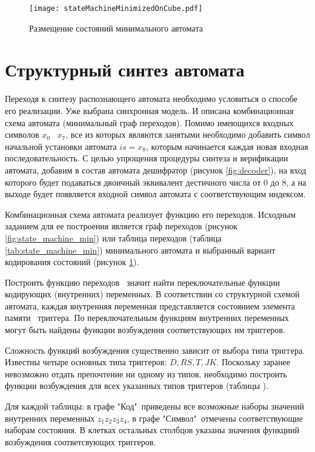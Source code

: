 \documentclass[a4paper,14pt,russian]{extarticle} %
\begin{document}
\begin{figure}[H]	
	\centering
	\texttt{[image: stateMachineMinimizedOnCube.pdf]}
	\caption{Размещение состояний минимального автомата}
	\label{fig:state_machine_on_cube}
\end{figure}

\section {Структурный синтез автомата}
Переходя к синтезу распознающего автомата необходимо условиться о способе его реализации. Уже выбрана синхронная модель. И описана комбинационная схема автомата (минимальный граф переходов). Помимо имеющихся входных символов \(x_0\) \textendash\ \(x_7\), все из которых являются занятыми необходимо добавить символ начальной установки автомата \(is=x_8\), которым начинается каждая новая входная последовательность. С целью упрощения процедуры синтеза и верификации автомата, добавим в состав автомата дешифратор (рисунок \ref{fig:decoder}), на вход которого будет подаваться двоичный эквивалент дестичного числа от \(0\) до \(8\), а на выходе будет появляется входной символ автомата с соответствующим индексом.

Комбинационная схема автомата реализует функцию его переходов. Исходным заданием для ее построения является граф переходов (рисунок \ref{fig:state_machine_min}) или таблица переходов (таблица \ref{tab:state_machine_min}) минимального автомата и выбранный вариант кодирования состояний (рисунок \ref{fig:state_machine_on_cube}).  

Построить функцию переходов \textendash\ значит найти переключательные функции кодирующих (внутренних) переменных.
В соответствии со структурной схемой автомата, каждая внутренняя переменная представляется состоянием элемента памяти \textendash\ триггера. По переключательным функциям внутренних переменных могут быть найдены функции возбуждения соответствующих им триггеров.

Сложность функций возбуждения существенно зависит от выбора типа триггера. Известны четыре основных типа триггеров: \(D, RS, T, JK\). Поскольку заранее невозможно отдать препочтение ни одному из типов, необходимо построить функции возбуждения для всех указанных типов триггеров (таблицы ). 

Для каждой таблицы: в графе "Код"\ приведены все возможные наборы значений внутренних переменных \(z_1 z_2 z_3 z_4\), в графе "Символ"\ отмечены соответствующие наборам состояния. В клетках остальных столбцов указаны значения функциий возбуждения соответсвующих триггеров.
\end{document}
